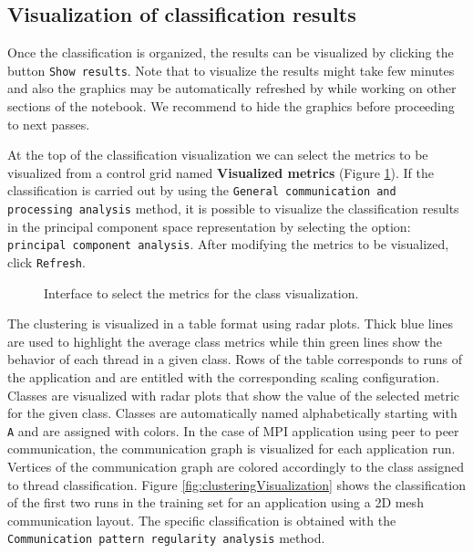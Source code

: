 \documentclass[a4paper, 10pt]{article}
\begin{document}
\subsection{Visualization of classification results}
Once the classification is organized, the results can be visualized by clicking the button \verb!Show results!. Note
that to visualize the results might take few minutes and also the graphics may be automatically refreshed by \mathe
while working on other sections of the \ex notebook. We recommend to hide the graphics before proceeding to next passes.

At the top of the classification visualization we can select the metrics to be visualized from a control grid named
\textbf{Visualized metrics} (Figure \ref{fig:clusteringMetricSelection}).
If the classification is carried out by using the \texttt{General communication and processing analysis} method,
it is possible to visualize the classification results in the principal component space representation by selecting
the option: \verb!principal component analysis!. After modifying the metrics to be visualized, click \texttt{Refresh}.


\begin{figure}[h!]
\centering
{}
\caption{Interface to select the metrics for the class visualization.}
\label{fig:clusteringMetricSelection}
\end{figure}

The clustering is visualized in a table format using radar plots. Thick blue lines are used to highlight the
average class metrics while thin green lines show the behavior of each thread in a given class.
Rows of the table corresponds to runs of the application
and are entitled with the corresponding scaling configuration. Classes are visualized with radar plots that show the value
of the selected metric for the given class. Classes are automatically named alphabetically starting with \verb!A!
and are assigned with colors. In the case of MPI application using peer to peer communication, the communication graph
is visualized for each application run. Vertices of the communication graph are colored accordingly to the class assigned
to thread classification. Figure \ref{fig:clusteringVisualization} shows the classification of the first two runs in the
training set for an application using a 2D mesh communication layout. The specific classification is obtained with the
\texttt{Communication pattern regularity analysis} method.
\end{document}
